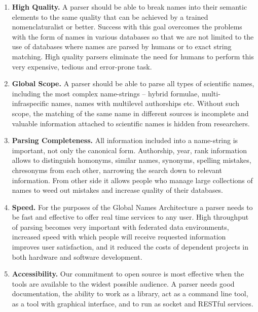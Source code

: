 \documentclass{bmcart}
\begin{document}
\begin{enumerate}

  \item \textbf{High Quality.} A parser should be able to break names into their
    semantic elements to the same quality that can be achieved by a  trained
    nomenclaturalist or better. Success with this goal overcomes the problems
    with the form of names in various databases so that we are not limited to
    the use of databases where names are parsed by humans or to exact string
    matching. High quality parsers eliminate the need for humans to perform
    this very expensive, tedious and error-prone task.

  \item \textbf{Global Scope.} A parser should be able to parse all types of
    scientific names, including the most complex name-strings -- hybrid
    formulae, multi-infraspecific names, names with multilevel authorships etc.
    Without such scope, the matching of the same name in different sources is
    incomplete and valuable information attached to scientific names is hidden
    from researchers.

  \item \textbf{Parsing Completeness.} All information included into a
    name-string is important, not only the canonical form. Authorship, year,
    rank information allows to distinguish homonyms, similar names, synonyms,
    spelling mistakes, chresonyms from each other, narrowing the search down to
    relevant information. From other side it allows people who manage large
    collections of names to weed out mistakes and increase quality of their
    databases.

  \item \textbf{Speed.} For the purposes of the Global Names Architecture a
    parser needs to be fast and effective to offer real time services to any
    user. High throughput of parsing becomes very important with federated data
    environments, increased speed with which people will receive requested
    information improves user satisfaction, and it reduced the costs of
    dependent projects in both hardware and software development.

  \item \textbf{Accessibility.} Our commitment to open source is most effective
    when the tools are available to the widest possible audience. A parser
    needs good documentation, the ability to work as a library, act as a
    command line tool, as a tool with graphical interface, and to run as socket
    and RESTful services.

\end{enumerate}
\end{document}
